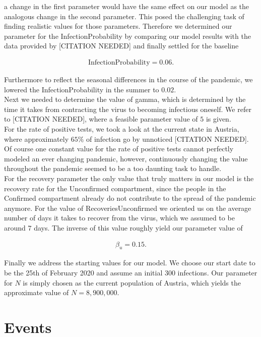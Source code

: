 \documentclass
[
    a4paper,
    11pt,
    bibliography = totoc,
    listof = totoc,
    headinclude = true,
]
{scrbook}
\begin{document}
a change in the first parameter would have the same effect on our model
as the analogous change in the second parameter.
This posed the challenging task of finding realistic values for those parameters.
Therefore we determined our parameter for the InfectionProbability by comparing
our model results with the data provided by [CITATION NEEDED] and finally
settled for the baseline

\begin{align*}
  \text{InfectionProbability} = 0.06.
\end{align*}

Furthermore to reflect the seasonal differences in the course of the pandemic,
we lowered the InfectionProbability in the summer to $0.02$. \\
Next we needed to determine the value of gamma, which is determined by the time
it takes from contracting the virus to becoming infectious oneself.
We refer to [CITATION NEEDED], where a feasible parameter value of $5$ is given. \\
For the rate of positive tests, we took a look at the current state in Austria,
where approximately $65\%$ of infection go by unnoticed [CITATION NEEDED].
Of course one constant value for the rate of positive tests cannot perfectly
modeled an ever changing pandemic, however, continuously changing the value
throughout the pandemic seemed to be a too daunting task to handle. \\
For the recovery parameter the only value that truly matters in our model
is the recovery rate for the Unconfirmed compartment, since the people in the
Confirmed compartment already do not contribute to the spread of the pandemic anymore.
For the value of RecoveriesUnconfirmed we oriented us on the average number of days
it takes to recover from the virus, which we assumed to be around $7$ days.
The inverse of this value roughly yield our parameter value of

\begin{align*}
  \beta_u = 0.15.
\end{align*}

Finally we address the starting values for our model. We choose our start date
to be the 25th of February 2020 and assume an initial 300 infections.
Our parameter for $N$ is simply chosen as the current population of Austria,
which yields the approximate value of $N = 8,900,000$.

\section{Events}
\end{document}
